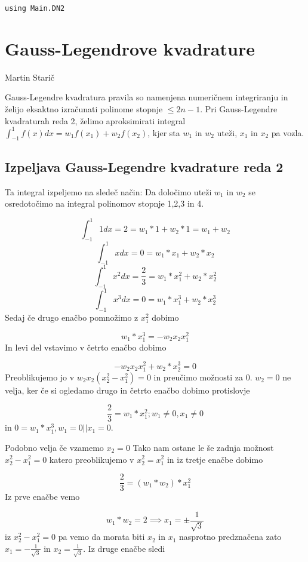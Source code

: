 \documentclass[12pt,a4paper]{article}
\begin{document}
\begin{verbatim}
using Main.DN2
\end{verbatim}

\section{Gauss-Legendrove kvadrature}
Martin Starič

Gauss-Legendre kvadratura pravila so namenjena numeričnem integriranju in želijo eksaktno izračunati polinome stopnje $\leq 2n-1$. Pri Gauss-Legendre kvadraturah reda 2, želimo aproksimirati integral $\int_{-1}^1 f(x) dx = w_1f(x_1) + w_2f(x_2)$, kjer sta $w_1$ in $w_2$ uteži, $x_1$ in $x_2$ pa vozla.

\subsection{Izpeljava Gauss-Legendre kvadrature reda 2}
Ta integral izpeljemo na sledeč način: Da določimo uteži $w_1$ in $w_2$ se osredotočimo na integral polinomov stopnje 1,2,3 in 4.

\[
\int_{-1}^1 1 dx = 2 = w_1 * 1 + w_2 * 1 = w_1 + w_2
\]
\[
\int_{-1}^1 x dx = 0 = w_1 * x_1 + w_2 * x_2
\]
\[
\int_{-1}^1 x^2 dx = \frac{2}{3} = w_1 * x_1^2 + w_2 * x_2^2
\]
\[
\int_{-1}^1 x^3 dx = 0 = w_1 * x_1^3 + w_2 * x_2^3
\]
Sedaj če drugo enačbo pomnožimo z $x_1^2$ dobimo 

\[
w_1 * x_1^3 = -w_2x_2x_1^2
\]
In levi del vstavimo v četrto enačbo dobimo 

\[
-w_2x_2x_1^2 + w_2 * x_2^3 = 0
\]
Preoblikujemo jo v $w_2x_2(x_2^2-x_1^2) = 0$ in preučimo možnosti za 0. $w_2 = 0$ ne velja, ker če si ogledamo drugo in četrto enačbo dobimo protislovje 

\[
\frac{2}{3} = w_1 * x_1^2 ; w_1 \neq 0, x_1 \neq 0
\]
in $0 = w_1 * x_1^3, w_1 = 0 || x_1 = 0$.

Podobno velja če vzamemo $x_2 = 0$ Tako nam ostane le še zadnja možnost $x_2^2 - x_1^2 = 0$ katero preoblikujemo v $x_2^2 = x_1^2$ in iz tretje enačbe dobimo 

\[
\frac{2}{3} = (w_1 * w_2) * x_1^2
\]
Iz prve enačbe vemo 

\[
w_1 * w_2 = 2 \implies x_1 = \pm \frac{1}{\sqrt{3}}
\]
iz  $x_2^2 - x_1^2 = 0$ pa vemo da morata biti $x_2$ in $x_1$ nasprotno predznačena zato $x_1 = -\frac{1}{\sqrt{3}}$ in $x_2 = \frac{1}{\sqrt{3}}$. Iz druge enačbe sledi 
\end{document}

